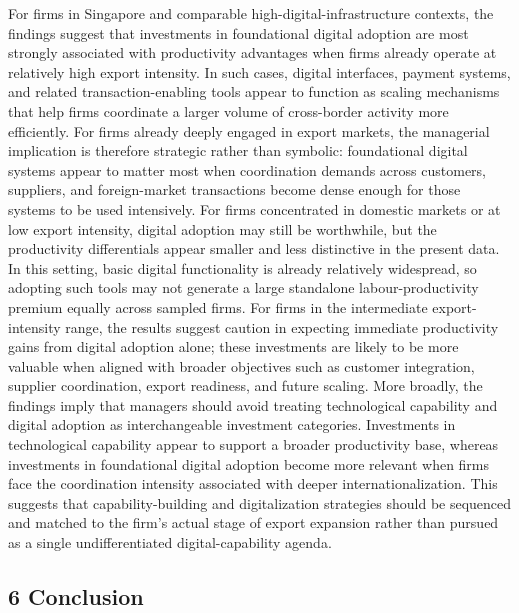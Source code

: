 \documentclass[12pt,a4paper]{article}
\begin{document}
For firms in Singapore and comparable high-digital-infrastructure
contexts, the findings suggest that investments in foundational digital
adoption are most strongly associated with productivity advantages when
firms already operate at relatively high export intensity. In such
cases, digital interfaces, payment systems, and related
transaction-enabling tools appear to function as scaling mechanisms that
help firms coordinate a larger volume of cross-border activity more
efficiently. For firms already deeply engaged in export markets, the
managerial implication is therefore strategic rather than symbolic:
foundational digital systems appear to matter most when coordination
demands across customers, suppliers, and foreign-market transactions
become dense enough for those systems to be used intensively. For firms
concentrated in domestic markets or at low export intensity, digital
adoption may still be worthwhile, but the productivity differentials
appear smaller and less distinctive in the present data. In this
setting, basic digital functionality is already relatively widespread,
so adopting such tools may not generate a large standalone
labour-productivity premium equally across sampled firms. For firms in
the intermediate export-intensity range, the results suggest caution in
expecting immediate productivity gains from digital adoption alone;
these investments are likely to be more valuable when aligned with
broader objectives such as customer integration, supplier coordination,
export readiness, and future scaling. More broadly, the findings imply
that managers should avoid treating technological capability and digital
adoption as interchangeable investment categories. Investments in
technological capability appear to support a broader productivity base,
whereas investments in foundational digital adoption become more
relevant when firms face the coordination intensity associated with
deeper internationalization. This suggests that capability-building and
digitalization strategies should be sequenced and matched to the firm's
actual stage of export expansion rather than pursued as a single
undifferentiated digital-capability agenda.

\hypertarget{6-conclusion}{%
\subsection{6 Conclusion}\label{6-conclusion}}
\end{document}
